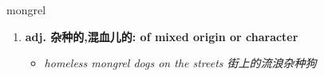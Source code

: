
\begin{frame}
{\huge mongrel}
\begin{center}
\begin{enumerate}\Large
  \item \textbf{adj. 杂种的,混血儿的: of mixed origin or character}
  \begin{itemize}
    \item \em{\Large{homeless mongrel dogs on the streets 街上的流浪杂种狗}}
  \end{itemize}
\end{enumerate}
\end{center}
\end{frame}
